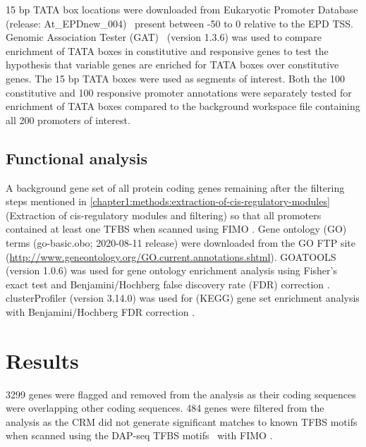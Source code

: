 \documentclass[../main.tex]{subfiles}
\begin{document}
15 bp TATA box locations were downloaded from Eukaryotic Promoter Database (release: At\_EPDnew\_004)~\autocite{dreosEukaryoticPromoterDatabase2017} present between -50 to 0 relative to the EPD TSS.
Genomic Association Tester (GAT)~\autocite{hegerGATSimulationFramework2013} (version 1.3.6) was used to
compare enrichment of TATA boxes in constitutive and responsive genes to test the hypothesis that variable genes are enriched for TATA boxes over constitutive genes.
The 15 bp TATA boxes were used as segments of interest. Both the 100 constitutive and 100 responsive promoter annotations were separately tested for enrichment of TATA boxes compared to the background workspace file containing all 200 promoters of interest.

\subsection{Functional analysis}
\label{chapter1:methods:functional-analysis}

A background gene set of all protein coding genes remaining after the filtering steps mentioned in \autoref{chapter1:methods:extraction-of-cis-regulatory-modules} (Extraction of cis-regulatory modules and filtering) so that all promoters contained at least one TFBS when scanned using FIMO \autocite{grantFIMOScanningOccurrences2011}.
Gene ontology (GO) terms (go-basic.obo; 2020-08-11 release) were downloaded from the GO FTP site (\url{http://www.geneontology.org/GO.current.annotations.shtml}).
GOATOOLS \autocite{klopfensteinGOATOOLSPythonLibrary2018} (version 1.0.6) was used for gene ontology enrichment analysis using Fisher's exact test \autocite{fisherInterpretationContingencyTables1922} and Benjamini/Hochberg false discovery rate (FDR) correction \autocite{benjaminiControllingFalseDiscovery1995}.
clusterProfiler \autocite{yuClusterProfilerPackageComparing2012} (version 3.14.0) was used for (KEGG) gene set enrichment analysis \autocite{kanehisaKEGGKyotoEncyclopedia2000} with Benjamini/Hochberg FDR correction \autocite{benjaminiControllingFalseDiscovery1995}.

\section{Results}
\label{chapter1:results}
3299 genes were flagged and removed from the analysis as their coding sequences were overlapping other coding sequences.
484 genes were filtered from the analysis as the CRM did not generate significant matches to known TFBS motifs when scanned using the DAP\hyp{}seq TFBS motifs~\autocite{omalleyCistromeEpicistromeFeatures2016} with FIMO \autocite{grantFIMOScanningOccurrences2011}.
\end{document}
